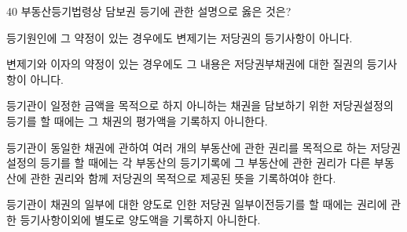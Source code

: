 \begin{question}{40}
부동산등기법령상 담보권 등기에 관한 설명으로 옳은 것은?
\begin{choices}
  \item 등기원인에 그 약정이 있는 경우에도 변제기는 저당권의 등기사항이 아니다.
  \item 변제기와 이자의 약정이 있는 경우에도 그 내용은 저당권부채권에 대한 질권의 등기사항이 아니다.
  \item 등기관이 일정한 금액을 목적으로 하지 아니하는 채권을 담보하기 위한 저당권설정의 등기를 할 때에는 그 채권의 평가액을 기록하지 아니한다.
  \item 등기관이 동일한 채권에 관하여 여러 개의 부동산에 관한 권리를 목적으로 하는 저당권설정의 등기를 할 때에는 각 부동산의 등기기록에 그 부동산에 관한 권리가 다른 부동산에 관한 권리와 함께 저당권의 목적으로 제공된 뜻을 기록하여야 한다.
  \item 등기관이 채권의 일부에 대한 양도로 인한 저당권 일부이전등기를 할 때에는 권리에 관한 등기사항이외에 별도로 양도액을 기록하지 아니한다.
\end{choices}
\end{question}
